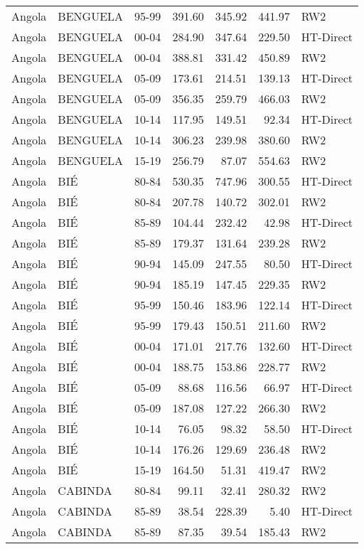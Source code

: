 \begin{longtable}{lllrrrl}
  Angola & BENGUELA & 95-99 & 391.60 & 345.92 & 441.97 & RW2 \\ 
  Angola & BENGUELA & 00-04 & 284.90 & 347.64 & 229.50 & HT-Direct \\ 
  Angola & BENGUELA & 00-04 & 388.81 & 331.42 & 450.89 & RW2 \\ 
  Angola & BENGUELA & 05-09 & 173.61 & 214.51 & 139.13 & HT-Direct \\ 
  Angola & BENGUELA & 05-09 & 356.35 & 259.79 & 466.03 & RW2 \\ 
  Angola & BENGUELA & 10-14 & 117.95 & 149.51 & 92.34 & HT-Direct \\ 
  Angola & BENGUELA & 10-14 & 306.23 & 239.98 & 380.60 & RW2 \\ 
  Angola & BENGUELA & 15-19 & 256.79 & 87.07 & 554.63 & RW2 \\ 
  Angola & BIÉ & 80-84 & 530.35 & 747.96 & 300.55 & HT-Direct \\ 
  Angola & BIÉ & 80-84 & 207.78 & 140.72 & 302.01 & RW2 \\ 
  Angola & BIÉ & 85-89 & 104.44 & 232.42 & 42.98 & HT-Direct \\ 
  Angola & BIÉ & 85-89 & 179.37 & 131.64 & 239.28 & RW2 \\ 
  Angola & BIÉ & 90-94 & 145.09 & 247.55 & 80.50 & HT-Direct \\ 
  Angola & BIÉ & 90-94 & 185.19 & 147.45 & 229.35 & RW2 \\ 
  Angola & BIÉ & 95-99 & 150.46 & 183.96 & 122.14 & HT-Direct \\ 
  Angola & BIÉ & 95-99 & 179.43 & 150.51 & 211.60 & RW2 \\ 
  Angola & BIÉ & 00-04 & 171.01 & 217.76 & 132.60 & HT-Direct \\ 
  Angola & BIÉ & 00-04 & 188.75 & 153.86 & 228.77 & RW2 \\ 
  Angola & BIÉ & 05-09 & 88.68 & 116.56 & 66.97 & HT-Direct \\ 
  Angola & BIÉ & 05-09 & 187.08 & 127.22 & 266.30 & RW2 \\ 
  Angola & BIÉ & 10-14 & 76.05 & 98.32 & 58.50 & HT-Direct \\ 
  Angola & BIÉ & 10-14 & 176.26 & 129.69 & 236.48 & RW2 \\ 
  Angola & BIÉ & 15-19 & 164.50 & 51.31 & 419.47 & RW2 \\ 
  Angola & CABINDA & 80-84 & 99.11 & 32.41 & 280.32 & RW2 \\ 
  Angola & CABINDA & 85-89 & 38.54 & 228.39 & 5.40 & HT-Direct \\ 
  Angola & CABINDA & 85-89 & 87.35 & 39.54 & 185.43 & RW2 \\ 

\end{longtable}
